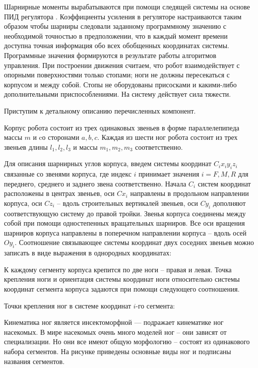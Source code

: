 Шарнирные моменты вырабатываются при помощи следящей системы на основе ПИД регулятора . Коэффициенты усиления в регуляторе настраиваются таким образом чтобы шарниры следовали заданному программному значению с необходимой точностью в предположении, что в каждый момент времени доступна точная информация обо всех обобщенных координатах системы. Программные значения формируются в результате работы алгоритмов управления.
При построении движения считаем, что робот взаимодействует с опорными поверхностями только стопами; ноги не должны пересекаться с корпусом и между собой. Стопы не оборудованы присосками и какими-либо дополнительными приспособлениями. На систему действует сила тяжести.

Приступим к детальному описанию перечисленных компонент.

Корпус робота состоит из трех одинаковых звеньев в форме параллелепипеда массы $m$ и cо сторонами $a,b,c$. Каждая из шести ног робота состоит из трех звеньев длины $l_1,l_2,l_3$ и массы $m_1,m_2,m_3$ соответственно.

Для описания шарнирных углов корпуса, введем системы координат $C_ix_iy_iz_i$ связанные со звенями корпуса, где индекс $i$ принимает значения $i = F,M,R$ для переднего, среднего и заднего звена соответственно. Начала $C_i$ систем координат расположены в центрах звеньев, оси $Cx_i$ направлены в продольном направлении корпуса, оси $Cz_i$ -- вдоль строительных вертикалей звеньев, оси $Cy_i$ дополняют соответствующую систему до правой тройки.
Звенья корпуса соединены между собой при помощи одностепенных вращательных шарниров. Все оси вращения шарниров корпуса направлены в поперечном направлении корпуса -- вдоль осей $Oy_i$. Соотношение связывающее системы координат двух соседних звеньев можно записать в виде выражения в однородных координатах:



К каждому сегменту корпуса крепится по две ноги -- правая и левая. Точка крепления ноги и ориентация системы координат ноги относительно системы координат сегмента корпуса задаются при помощи следующего соотношения.


 Точки крепления ног в системе координат $i$-го сегмента:


Кинематика ног является инсектоморфной --- подражает кинематике ног насекомых. В мире насекомых очень много моделей ног -- они зависят от специализации. Но они все имеют общую морфологию -- состоят из одинакового набора сегментов. На рисунке  приведены основные виды ног и подписаны названия сегментов.

